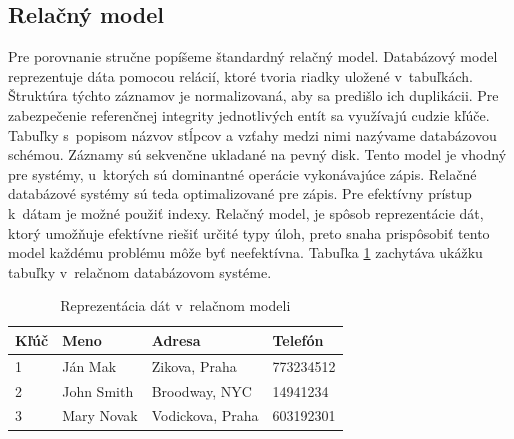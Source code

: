 \documentclass[11pt,twoside,a4paper]{book}
\begin{document}

\subsection{Relačný model}
Pre porovnanie stručne popíšeme štandardný relačný model. Databázový model reprezentuje dáta pomocou relácií, ktoré tvoria riadky uložené v~tabuľkách. Štruktúra týchto záznamov je normalizovaná, aby sa predišlo ich duplikácii. Pre zabezpečenie referenčnej integrity jednotlivých entít sa využívajú cudzie kľúče. Tabuľky s~popisom názvov stĺpcov a vzťahy medzi nimi nazývame databázovou schémou. Záznamy sú sekvenčne ukladané na pevný disk. Tento model je vhodný pre systémy, u~ktorých sú dominantné operácie vykonávajúce zápis. Relačné databázové systémy sú teda optimalizované pre zápis. Pre efektívny prístup k~dátam je možné použiť indexy. Relačný model, je spôsob reprezentácie dát, ktorý umožňuje efektívne riešiť určité typy úloh, preto snaha prispôsobiť tento model každému problému môže byť neefektívna. Tabuľka \ref{tab:relacnyModel} zachytáva ukážku tabuľky v~relačnom databázovom systéme.



\begin{table}[hp]
\begin{center}
    \begin{tabular}{l|l|l|l}

  Kľúč & Meno & Adresa & Telefón\\ \hline

  1&Ján Mak & Zikova, Praha & 773234512 \\
  2&John Smith  & Broodway, NYC & 14941234\\
  3&Mary Novak & Vodickova, Praha & 603192301\\

    \end{tabular}
\end{center}
\caption{Reprezentácia dát v~relačnom modeli}
\label{tab:relacnyModel}
\end{table}
\end{document}

